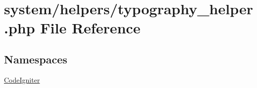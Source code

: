 \hypertarget{typography__helper_8php}{\section{system/helpers/typography\-\_\-helper.php File Reference}
\label{typography__helper_8php}
}
\subsection*{Namespaces}
\begin{DoxyCompactItemize}
\item 
\hyperlink{namespace_code_igniter}{Code\-Igniter}
\end{DoxyCompactItemize}
